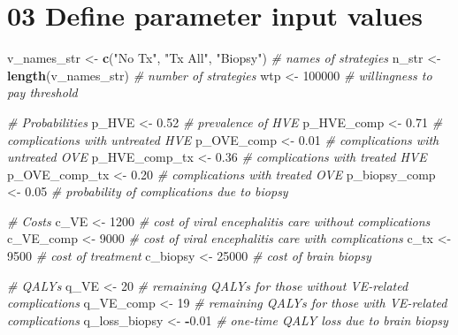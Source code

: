 \documentclass[]{article}
\newenvironment{Shaded}{\begin{snugshade}}{\end{snugshade}}
\newcommand{\KeywordTok}[1]{\textcolor[rgb]{0.13,0.29,0.53}{\textbf{#1}}}
\newcommand{\DecValTok}[1]{\textcolor[rgb]{0.00,0.00,0.81}{#1}}
\newcommand{\FloatTok}[1]{\textcolor[rgb]{0.00,0.00,0.81}{#1}}
\newcommand{\StringTok}[1]{\textcolor[rgb]{0.31,0.60,0.02}{#1}}
\newcommand{\CommentTok}[1]{\textcolor[rgb]{0.56,0.35,0.01}{\textit{#1}}}
\newcommand{\OperatorTok}[1]{\textcolor[rgb]{0.81,0.36,0.00}{\textbf{#1}}}
\newcommand{\NormalTok}[1]{#1}
\begin{document}
\section{03 Define parameter input
values}\label{define-parameter-input-values}

\begin{Shaded}
\begin{Highlighting}[]
\NormalTok{v_names_str <-}\StringTok{ }\KeywordTok{c}\NormalTok{(}\StringTok{"No Tx"}\NormalTok{, }\StringTok{"Tx All"}\NormalTok{, }\StringTok{"Biopsy"}\NormalTok{) }\CommentTok{# names of strategies}
\NormalTok{n_str       <-}\StringTok{ }\KeywordTok{length}\NormalTok{(v_names_str)            }\CommentTok{# number of strategies}
\NormalTok{wtp         <-}\StringTok{ }\DecValTok{100000}                         \CommentTok{# willingness to pay threshold}

\CommentTok{# Probabilities}
\NormalTok{p_HVE         <-}\StringTok{ }\FloatTok{0.52} \CommentTok{# prevalence of HVE}
\NormalTok{p_HVE_comp    <-}\StringTok{ }\FloatTok{0.71} \CommentTok{# complications with untreated HVE}
\NormalTok{p_OVE_comp    <-}\StringTok{ }\FloatTok{0.01} \CommentTok{# complications with untreated OVE}
\NormalTok{p_HVE_comp_tx <-}\StringTok{ }\FloatTok{0.36} \CommentTok{# complications with treated HVE}
\NormalTok{p_OVE_comp_tx <-}\StringTok{ }\FloatTok{0.20} \CommentTok{# complications with treated OVE}
\NormalTok{p_biopsy_comp <-}\StringTok{ }\FloatTok{0.05} \CommentTok{# probability of complications due to biopsy}

\CommentTok{# Costs}
\NormalTok{c_VE      <-}\StringTok{ }\DecValTok{1200}  \CommentTok{# cost of viral encephalitis care without complications}
\NormalTok{c_VE_comp <-}\StringTok{ }\DecValTok{9000}  \CommentTok{# cost of viral encephalitis care with complications}
\NormalTok{c_tx      <-}\StringTok{ }\DecValTok{9500}  \CommentTok{# cost of treatment}
\NormalTok{c_biopsy  <-}\StringTok{ }\DecValTok{25000} \CommentTok{# cost of brain biopsy}

\CommentTok{# QALYs}
\NormalTok{q_VE          <-}\StringTok{ }\DecValTok{20}    \CommentTok{# remaining QALYs for those without VE-related complications}
\NormalTok{q_VE_comp     <-}\StringTok{ }\DecValTok{19}    \CommentTok{# remaining QALYs for those with VE-related complications}
\NormalTok{q_loss_biopsy <-}\StringTok{ }\OperatorTok{-}\FloatTok{0.01} \CommentTok{# one-time QALY loss due to brain biopsy}


\end{Highlighting}
\end{Shaded}
\end{document}
